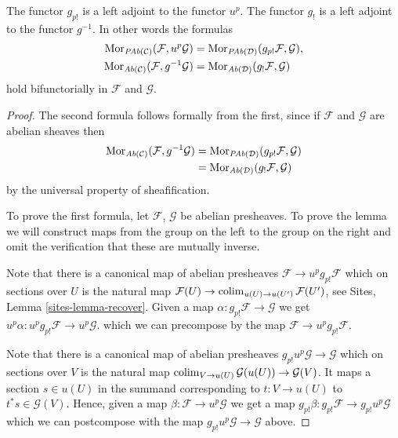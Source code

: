 \begin{lemma}
\label{lemma-g-shriek-adjoint}
The functor $g_{p!}$ is a left adjoint to the functor $u^p$.
The functor $g_!$ is a left adjoint to the functor $g^{-1}$.
In other words the formulas
\begin{align*}
\mathop{\rm Mor}\nolimits_{\textit{PAb}(\mathcal{C})}(\mathcal{F}, u^p\mathcal{G})
& =
\mathop{\rm Mor}\nolimits_{\textit{PAb}(\mathcal{D})}(g_{p!}\mathcal{F}, \mathcal{G}), \\
\mathop{\rm Mor}\nolimits_{\textit{Ab}(\mathcal{C})}(\mathcal{F}, g^{-1}\mathcal{G})
& =
\mathop{\rm Mor}\nolimits_{\textit{Ab}(\mathcal{D})}(g_!\mathcal{F}, \mathcal{G})
\end{align*}
hold bifunctorially in $\mathcal{F}$ and $\mathcal{G}$.
\end{lemma}

\begin{proof}
The second formula follows formally from the first, since if
$\mathcal{F}$ and $\mathcal{G}$ are abelian sheaves then
\begin{align*}
\mathop{\rm Mor}\nolimits_{\textit{Ab}(\mathcal{C})}(\mathcal{F}, g^{-1}\mathcal{G})
& =
\mathop{\rm Mor}\nolimits_{\textit{PAb}(\mathcal{D})}(g_{p!}\mathcal{F}, \mathcal{G}) \\
& =
\mathop{\rm Mor}\nolimits_{\textit{Ab}(\mathcal{D})}(g_!\mathcal{F}, \mathcal{G})
\end{align*}
by the universal property of sheafification.

\medskip\noindent
To prove the first formula, let $\mathcal{F}$, $\mathcal{G}$ be abelian
presheaves. To prove the lemma we will construct maps from the group on the
left to the group on the right and omit the verification that these are
mutually inverse.

\medskip\noindent
Note that there is a canonical map of abelian presheaves
$\mathcal{F} \to u^pg_{p!}\mathcal{F}$ which on sections over $U$ is the
natural map
$\mathcal{F}(U) \to \mathop{\rm colim}\nolimits_{u(U) \to u(U')} \mathcal{F}(U')$, see
Sites, Lemma \ref{sites-lemma-recover}.
Given a map $\alpha : g_{p!}\mathcal{F} \to \mathcal{G}$
we get $u^p\alpha : u^pg_{p!}\mathcal{F} \to u^p\mathcal{G}$.
which we can precompose by the map $\mathcal{F} \to u^pg_{p!}\mathcal{F}$.

\medskip\noindent
Note that there is a canonical map of abelian presheaves
$g_{p!}u^p\mathcal{G} \to \mathcal{G}$ which on sections over
$V$ is the natural map
$\mathop{\rm colim}\nolimits_{V \to u(U)} \mathcal{G}(u(U)) \to \mathcal{G}(V)$.
It maps a section $s \in u(U)$ in the summand corresponding to
$t : V \to u(U)$ to $t^*s \in \mathcal{G}(V)$.
Hence, given a map $\beta : \mathcal{F} \to u^p\mathcal{G}$
we get a map $g_{p!}\beta : g_{p!}\mathcal{F} \to g_{p!}u^p\mathcal{G}$
which we can postcompose with the map $g_{p!}u^p\mathcal{G} \to \mathcal{G}$
above.
\end{proof}

